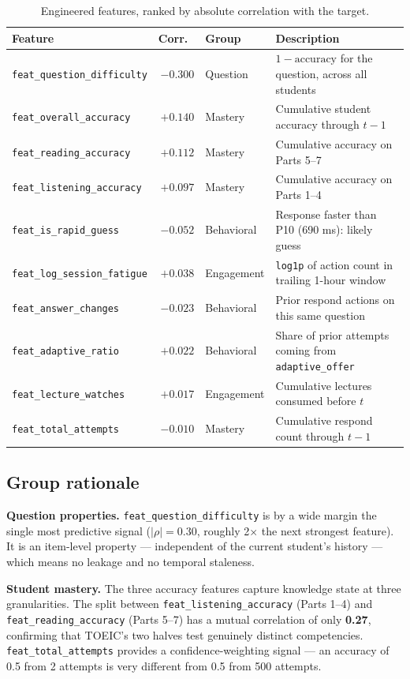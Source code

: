 \begin{table}[H]
\centering
\small
\begin{tabular}{lrll}
\toprule
Feature & Corr.\ & Group & Description \\
\midrule
\texttt{feat\_question\_difficulty}    & $-0.300$ & Question  & $1 - \text{accuracy}$ for the question, across all students \\
\texttt{feat\_overall\_accuracy}       & $+0.140$ & Mastery   & Cumulative student accuracy through $t-1$ \\
\texttt{feat\_reading\_accuracy}       & $+0.112$ & Mastery   & Cumulative accuracy on Parts 5--7 \\
\texttt{feat\_listening\_accuracy}     & $+0.097$ & Mastery   & Cumulative accuracy on Parts 1--4 \\
\texttt{feat\_is\_rapid\_guess}        & $-0.052$ & Behavioral& Response faster than P10 (690 ms): likely guess \\
\texttt{feat\_log\_session\_fatigue}   & $+0.038$ & Engagement& \texttt{log1p} of action count in trailing 1-hour window \\
\texttt{feat\_answer\_changes}         & $-0.023$ & Behavioral& Prior respond actions on this same question \\
\texttt{feat\_adaptive\_ratio}         & $+0.022$ & Behavioral& Share of prior attempts coming from \texttt{adaptive\_offer} \\
\texttt{feat\_lecture\_watches}        & $+0.017$ & Engagement& Cumulative lectures consumed before $t$ \\
\texttt{feat\_total\_attempts}         & $-0.010$ & Mastery   & Cumulative respond count through $t-1$ \\
\bottomrule
\end{tabular}
\caption{Engineered features, ranked by absolute correlation with the target.}
\end{table}

\subsection{Group rationale}

\textbf{Question properties.} \texttt{feat\_question\_difficulty} is by
a wide margin the single most predictive signal ($|\rho| = 0.30$,
roughly 2$\times$ the next strongest feature). It is an item-level
property — independent of the current student's history — which means
no leakage and no temporal staleness.

\textbf{Student mastery.} The three accuracy features capture knowledge
state at three granularities. The split between
\texttt{feat\_listening\_accuracy} (Parts 1--4) and
\texttt{feat\_reading\_accuracy} (Parts 5--7) has a mutual correlation
of only \textbf{0.27}, confirming that TOEIC's two halves test
genuinely distinct competencies. \texttt{feat\_total\_attempts}
provides a confidence-weighting signal — an accuracy of 0.5 from 2
attempts is very different from 0.5 from 500 attempts.

